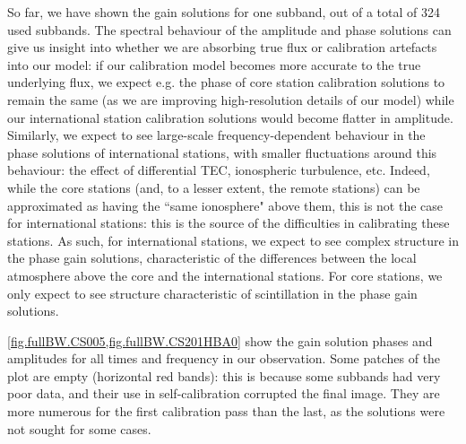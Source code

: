 \pg
So far, we have shown the gain solutions for one subband, out of a total of 324 used subbands. The spectral behaviour of the amplitude and phase solutions can give us insight into whether we are absorbing true flux or calibration artefacts into our model: if our calibration model becomes more accurate to the true underlying flux, we expect e.g. the phase of core station calibration solutions to remain the same (as we are improving high-resolution details of our model) while our international station calibration solutions would become flatter in amplitude. Similarly, we expect to see large-scale frequency-dependent behaviour in the phase solutions of international stations, with smaller fluctuations around this behaviour: the effect of differential TEC, ionospheric turbulence, etc. Indeed, while the core stations (and, to a lesser extent, the remote stations) can be approximated as having the ``same ionosphere" above them, this is not the case for international stations: this is the source of the difficulties in calibrating these stations. As such, for international stations, we expect to see complex structure in the phase gain solutions, characteristic of the differences between the local atmosphere above the core and the international stations. For core stations, we only expect to see structure characteristic of scintillation in the phase gain solutions. 

\pg
\cref{fig.fullBW.CS005,fig.fullBW.CS201HBA0} show the gain solution phases and amplitudes for all times and frequency in our observation. Some patches of the plot are empty (horizontal red bands): this is because some subbands had very poor data, and their use in self-calibration corrupted the final image. They are more numerous for the first calibration pass than the last, as the solutions were not sought for some cases.

